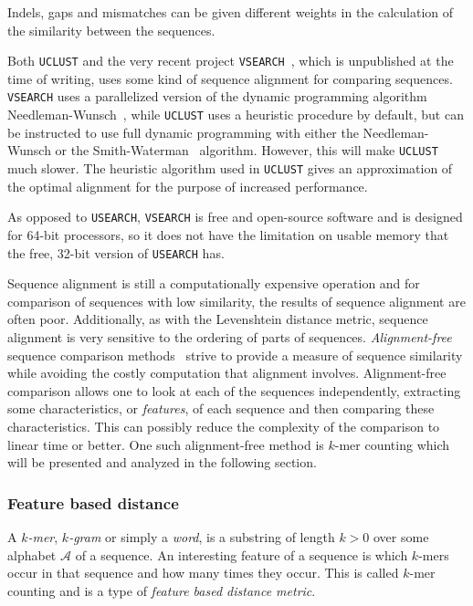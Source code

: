 Indels, gaps and mismatches can be given different weights in the calculation
of the similarity between the sequences.

Both \texttt{UCLUST} and the very recent project
\texttt{VSEARCH}~\cite{vsearch}, which is unpublished at the time of writing,
uses some kind of sequence alignment for comparing sequences. \texttt{VSEARCH}
uses a parallelized version of the dynamic programming algorithm
Needleman-Wunsch~\cite{needleman}, while \texttt{UCLUST} uses a heuristic
procedure by default, but can be instructed to use full dynamic programming
with either the Needleman-Wunsch or the Smith-Waterman~\cite{smith} algorithm.
However, this will make \texttt{UCLUST} much slower. The heuristic algorithm
used in \texttt{UCLUST} gives an approximation of the optimal alignment for the
purpose of increased performance.

As opposed to \texttt{USEARCH}, \texttt{VSEARCH} is free and open-source
software and is designed for 64-bit processors, so it does not have the
limitation on usable memory that the free, 32-bit version of \texttt{USEARCH}
has.


Sequence alignment is still a computationally expensive operation and for
comparison of sequences with low similarity, the results of sequence alignment
are often poor. Additionally, as with the Levenshtein distance metric,
sequence alignment is very sensitive to the ordering of parts of sequences.
\emph{Alignment-free} sequence comparison methods~\cite{vinga} strive to
provide a measure of sequence similarity while avoiding the costly computation
that alignment involves. Alignment-free comparison allows one to look at each
of the sequences independently, extracting some characteristics, or
\emph{features}, of each sequence and then comparing these characteristics.
This can possibly reduce the complexity of the comparison to linear time or
better. One such alignment-free method is $k$-mer counting which will be
presented and analyzed in the following section.


\subsubsection{Feature based distance} \label{sec:kmer_distance}

A \emph{$k$-mer}, \emph{$k$-gram} or simply a \emph{word}, is a substring of
length $k>0$ over some alphabet $\mathcal{A}$ of a sequence. An interesting
feature of a sequence is which $k$-mers occur in that sequence and how many
times they occur. This is called $k$-mer counting and is a type of
\emph{feature based distance metric}.

